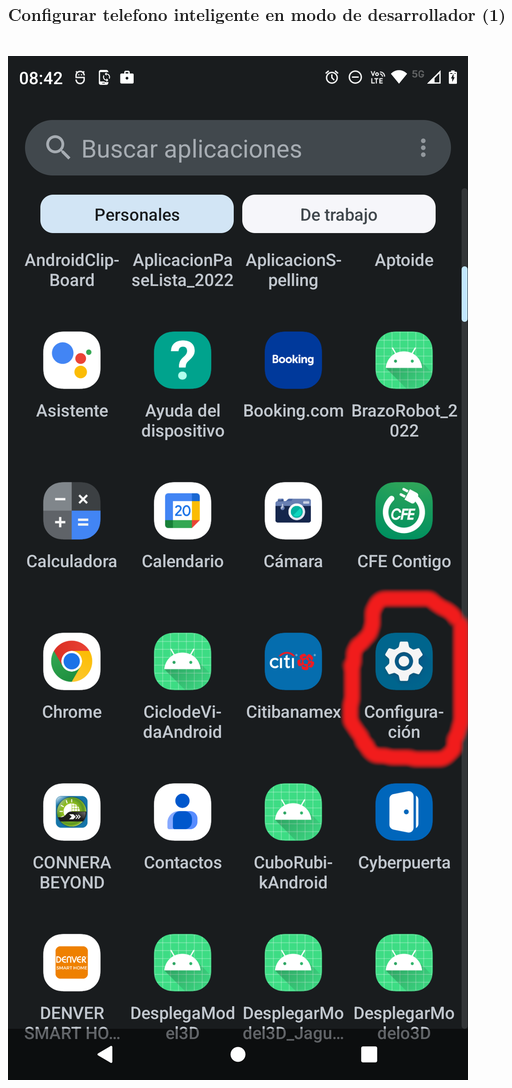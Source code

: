 \begin{frame}
\frametitle{Configurar telefono inteligente en modo de desarrollador (1)}  
\begin{columns}
\begin{center}
\includegraphics[width=0.95\linewidth]{01_Configurar/ModoDesarrollador1.png}    

\end{center}
\end{columns}
\end{frame}
